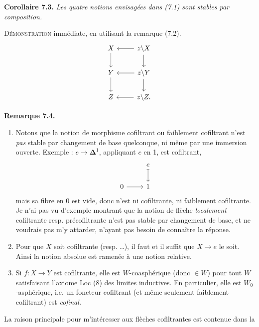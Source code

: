 \documentclass[11pt]{article}
\newcommand{\printedpage}[1]{\marginpar{\footnotesize p.~#1}}
\newcommand{\msp}[1]{\marginpar{\footnotesize [#1]}}
\begin{document}
\textbf{Corollaire 7.3.} \textit{Les quatre notions envisagées dans (7.1) sont stables par composition.}

\textsc{Démonstration} immédiate, en utilisant la remarque (7.2).
\[
\begin{tikzcd}
X \arrow[d] & z\backslash X \arrow[l] \arrow[d] \\
Y \arrow[d] & z\backslash Y \arrow[l] \arrow[d] \\
Z & z\backslash Z. \arrow[l]
\end{tikzcd}
\]

\printedpage{57}
\textbf{Remarque 7.4.}
\begin{enumerate}
\item[1)] Notons que la notion de morphisme cofiltrant ou faiblement cofiltrant n'est \textit{pas} stable par changement de base quelconque, ni même par une immersion ouverte. Exemple : $e \longrightarrow \boldsymbol{\Delta}^1$, appliquant $e$ en 1, est cofiltrant,
\[
\begin{tikzcd}
 & e \arrow[d, mapsto] \\
0 \arrow[r] & 1
\end{tikzcd}
\]
mais sa fibre en 0 est vide, donc n'est ni cofiltrante, ni faiblement cofiltrante. Je n'ai pas vu d'exemple montrant que la notion de flèche \textit{localement} cofiltrante resp. précofiltrante n'est pas stable par changement de base, et ne voudrais pas m'y attarder, n'ayant pas besoin de connaître la réponse.
\item[2)] Pour que $X$ soit cofiltrante (resp. \dots), il faut et il suffit que $X \longrightarrow e$ le soit. Ainsi la notion absolue est ramenée à une notion relative.
\item[3)] Si $f : X \longrightarrow Y$ est cofiltrante, elle est \msp{page 92} $W$-coasphérique (donc $\in W$) pour tout $W$ satisfaisant l'axiome Loc (8) des limites inductives. En particulier, elle est $W_0$-asphérique, i.e. un foncteur cofiltrant (et même seulement faiblement cofiltrant) est \textit{cofinal.}
\end{enumerate}
La raison principale pour m'intéresser aux flèches cofiltrantes est contenue dans la
\end{document}

